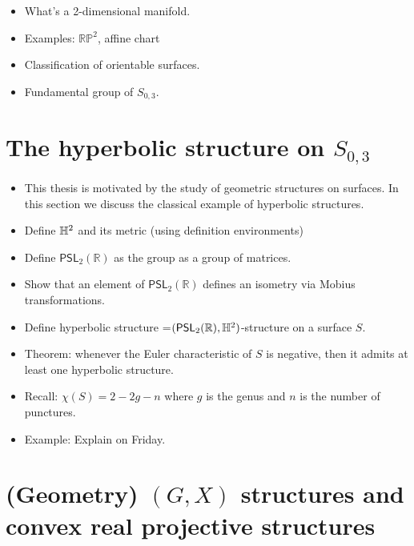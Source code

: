 \documentclass{amsart}
\begin{document}
	
	\begin{itemize}
		\item What's a 2-dimensional manifold.
		\item Examples: $\mathbb{RP}^2$, affine chart 
		\item Classification of orientable surfaces.
		\item Fundamental group of $S_{0,3}$.
	\end{itemize}
	
	\section{The hyperbolic structure on $S_{0,3}$}
	
	\begin{itemize}
		\item This thesis is motivated by the study of geometric structures on surfaces. In this section we discuss the classical example of hyperbolic structures.
		\item Define $\mathbb{H}^2$ and its metric (using definition environments)
		\item Define $\mathsf{PSL}_2(\mathbb R)$ as the group as a group of matrices.
		\item Show that an element of $\mathsf{PSL}_2(\mathbb R)$ defines an isometry via Mobius transformations. 
		\item Define hyperbolic structure =$(\mathsf{PSL}_2(\mathbb R),\mathbb{H}^2)$-structure on a surface $S$.
		\item Theorem: whenever the Euler characteristic of $S$ is negative, then it admits at least one hyperbolic structure.
		\item Recall: $\chi(S)=2-2g-n$ where $g$ is the genus and $n$ is the number of punctures.
		\item Example: Explain on Friday.
	\end{itemize}
	
	\section{(Geometry) $(G,X)$ structures and convex real projective structures}
	
\end{document}
